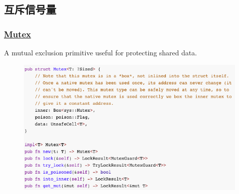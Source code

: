 \subsection{互斥信号量} %
\begin{frame}[fragile]
    \frametitle{\href{https://doc.rust-lang.org/std/sync/struct.Mutex.html}{Mutex}}

A mutual exclusion primitive useful for protecting shared data.

    \begin{figure}
    \includegraphics[width=0.8\linewidth]{figs/struct-mutex.png}
    \end{figure}

\end{frame}
% 
% 
% 
% 
% 
% 
% 
% 
% 
